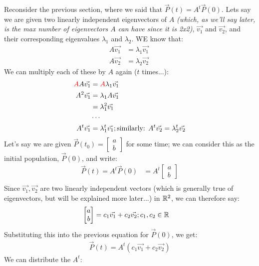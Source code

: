 \documentclass[12pt]{article}
\begin{document}
{Reconsider the previous section, where we said that $\vec{P}(t) = A^t \vec{P}(0)$. Lets say we are given two linearly independent eigenvectors of $A$ \textit{(which, as we'll say later, is the max number of eigenvectors $A$ can have since it is 2x2)}, $\vec{v_1}$ and $\vec{v_2}$, and their corresponding eigenvalues $\lambda_1$ and $\lambda_2$. WE know that:
\begin{align*}
        A\vec{v_1} &= \lambda_1\vec{v_1}\\
        A\vec{v_2} &= \lambda_2\vec{v_2}\
\end{align*}
We can multiply each of these by $A$ again ($t$ times...):
\begin{align*}
    \textcolor{red}{A}A\vec{v_1} &= \textcolor{red}{A}\lambda_1\vec{v_1}\\
    A^2 \vec{v_1} &= \lambda_1A\vec{v_1}\\
    &= \lambda_1^2\vec{v_1}\\
    &\cdots\\
    A^t \vec{v_1} &= \lambda_1^t\vec{v_1}; \text{similarly: } A^t \vec{v_2} = \lambda_2^t\vec{v_2}
\end{align*}
Let's say we are given $\vec{P}(t_0) = \begin{bmatrix}
    a\\
    b\end{bmatrix}$ for some time; we can consider this as the initial population, $\vec{P}(0)$, and write:
\begin{align*}
    \vec{P}(t) = A^t\vec{P}(0) &= A^t\begin{bmatrix}
        a\\
        b\end{bmatrix}\\
\end{align*}
Since $\vec{v_1}, \vec{v_2}$ are two linearly independent vectors (which is generally true of eigenvectors, but will be explained more later...) in $\mathbb{R}^2$, we can therefore say:
\begin{align*}
    \begin{bmatrix}
        a\\
        b\end{bmatrix} &= c_1\vec{v_1} + c_2\vec{v_2}; c_1, c_2 \in \mathbb{R}
\end{align*}
Substituting this into the previous equation for $\vec{P}(0)$, we get:
\begin{align*}
    \vec{P}(t) = A^t(c_1\vec{v_1} + c_2\vec{v_2})
\end{align*}
We can distribute the $A^t$:
\begin{align*}

\end{align*}}
\end{document}
